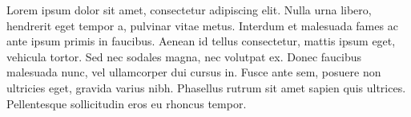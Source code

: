 Lorem ipsum dolor sit amet, consectetur adipiscing elit. Nulla urna libero, hendrerit eget tempor a, pulvinar vitae metus. Interdum et malesuada fames ac ante ipsum primis in faucibus. Aenean id tellus consectetur, mattis ipsum eget, vehicula tortor. Sed nec sodales magna, nec volutpat ex. Donec faucibus malesuada nunc, vel ullamcorper dui cursus in. Fusce ante sem, posuere non ultricies eget, gravida varius nibh. Phasellus rutrum sit amet sapien quis ultrices. Pellentesque sollicitudin eros eu rhoncus tempor.